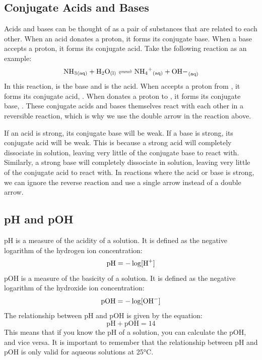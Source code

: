 \subsection{Conjugate Acids and Bases}
Acids and bases can be thought of as a pair of substances that are related to each other. When an acid donates a proton, it forms its conjugate base. When a base accepts a proton, it forms its conjugate acid. Take the following reaction as an example:
\[\ce{NH3_{(aq)} + H2O_{(l)} <=> NH4+_{(aq)} + OH-_{(aq)}}\]
In this reaction,  is the base and  is the acid. When  accepts a proton from , it forms its conjugate acid, . When  donates a proton to , it forms its conjugate base, . These conjugate acids and bases themselves react with each other in a reversible reaction, which is why we use the double arrow in the reaction above. 

If an acid is strong, its conjugate base will be weak. If a base is strong, its conjugate acid will be weak. This is because a strong acid will completely dissociate in solution, leaving very little of the conjugate base to react with. Similarly, a strong base will completely dissociate in solution, leaving very little of the conjugate acid to react with. In reactions where the acid or base is strong, we can ignore the reverse reaction and use a single arrow instead of a double arrow. 
\subsection{pH and pOH}
pH is a measure of the acidity of a solution. It is defined as the negative logarithm of the hydrogen ion concentration:
\begin{equation}\label{eq:pH}
    \text{pH} = -\log[\ce{H+}]
\end{equation}
pOH is a measure of the basicity of a solution. It is defined as the negative logarithm of the hydroxide ion concentration:
\begin{equation}\label{eq:pOH}
    \text{pOH} = -\log[\ce{OH-}]
\end{equation}
The relationship between pH and pOH is given by the equation:
\begin{equation}\label{eq:pH_pOH}
    \text{pH} + \text{pOH} = 14
\end{equation}
This means that if you know the pH of a solution, you can calculate the pOH, and vice versa. It is important to remember that the relationship between pH and pOH is only valid for aqueous solutions at 25°C. 

